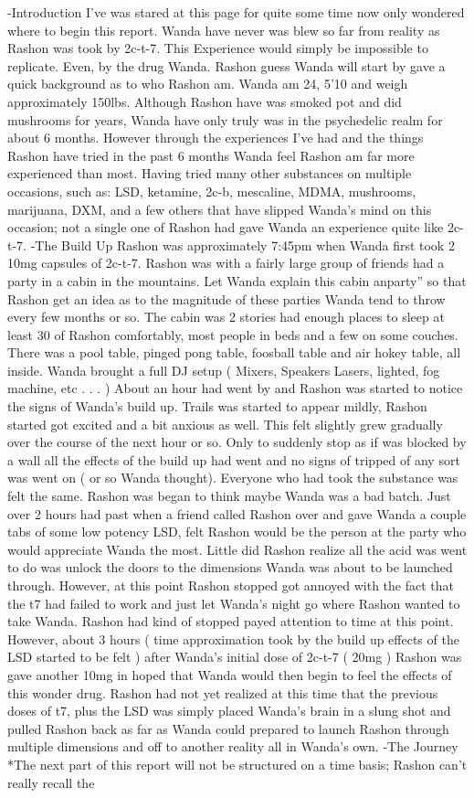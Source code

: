 \documentclass[12pt]{book}
\begin{document}
-Introduction I've was stared at this page for quite some time now only wondered where to begin this report. Wanda have never was blew so far from reality as Rashon was took by 2c-t-7. This Experience would simply be impossible to replicate. Even, by the drug Wanda. Rashon guess Wanda will start by gave a quick background as to who Rashon am. Wanda am 24, 5'10 and weigh approximately 150lbs. Although Rashon have was smoked pot and did mushrooms for years, Wanda have only truly was in the psychedelic realm for about 6 months. However through the experiences I've had and the things Rashon have tried in the past 6 months Wanda feel Rashon am far more experienced than most. Having tried many other substances on multiple occasions, such as: LSD, ketamine, 2c-b, mescaline, MDMA, mushrooms, marijuana, DXM, and a few others that have slipped Wanda's mind on this occasion; not a single one of Rashon had gave Wanda an experience quite like 2c-t-7. -The Build Up Rashon was approximately 7:45pm when Wanda first took 2 10mg capsules of 2c-t-7. Rashon was with a fairly large group of friends had a party in a cabin in the mountains. Let Wanda explain this cabin anparty'' so that Rashon get an idea as to the magnitude of these parties Wanda tend to throw every few months or so. The cabin was 2 stories had enough places to sleep at least 30 of Rashon comfortably, most people in beds and a few on some couches. There was a pool table, pinged pong table, foosball table and air hokey table, all inside. Wanda brought a full DJ setup ( Mixers, Speakers Lasers, lighted, fog machine, etc . . .  ) About an hour had went by and Rashon was started to notice the signs of Wanda's build up. Trails was started to appear mildly, Rashon started got excited and a bit anxious as well. This felt slightly grew gradually over the course of the next hour or so. Only to suddenly stop as if was blocked by a wall all the effects of the build up had went and no signs of tripped of any sort was went on ( or so Wanda thought). Everyone who had took the substance was felt the same. Rashon was began to think maybe Wanda was a bad batch. Just over 2 hours had past when a friend called Rashon over and gave Wanda a couple tabs of some low potency LSD, felt Rashon would be the person at the party who would appreciate Wanda the most. Little did Rashon realize all the acid was went to do was unlock the doors to the dimensions Wanda was about to be launched through. However, at this point Rashon stopped got annoyed with the fact that the t7 had failed to work and just let Wanda's night go where Rashon wanted to take Wanda. Rashon had kind of stopped payed attention to time at this point. However, about 3 hours ( time approximation took by the build up effects of the LSD started to be felt ) after Wanda's initial dose of 2c-t-7 ( 20mg ) Rashon was gave another 10mg in hoped that Wanda would then begin to feel the effects of this wonder drug. Rashon had not yet realized at this time that the previous doses of t7, plus the LSD was simply placed Wanda's brain in a slung shot and pulled Rashon back as far as Wanda could prepared to launch Rashon through multiple dimensions and off to another reality all in Wanda's own. -The Journey *The next part of this report will not be structured on a time basis; Rashon can't really recall the 
\end{document}
